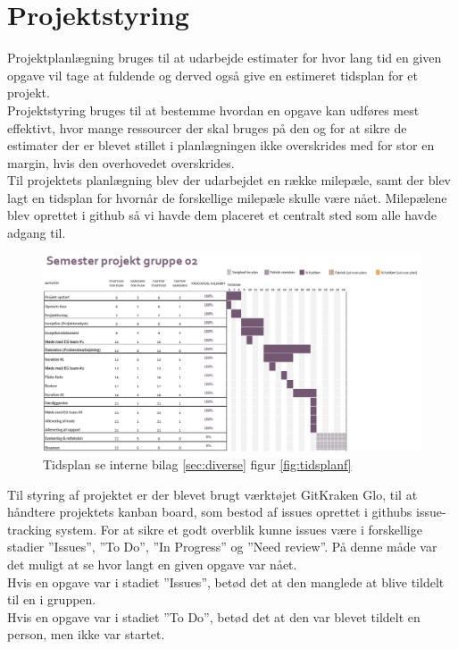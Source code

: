 \section{Projektstyring}
Projektplanlægning bruges til at udarbejde estimater for hvor lang tid en given opgave vil tage at fuldende og derved også give en estimeret tidsplan for et projekt.\\
Projektstyring bruges til at bestemme hvordan en opgave kan udføres mest effektivt, hvor mange ressourcer der skal bruges på den og for at sikre de estimater der er blevet stillet i planlægningen ikke overskrides med for stor en margin, hvis den overhovedet overskrides.\\
Til projektets planlægning blev der udarbejdet en række milepæle, samt der blev lagt en tidsplan for hvornår de forskellige milepæle skulle være nået. Milepælene blev oprettet i github så vi havde dem placeret et centralt sted som alle havde adgang til. 
\begin{figure}[h]
\includegraphics[width = \linewidth]{./PNG/proces/tidsplan.png}
\caption{Tidsplan se interne bilag \ref{sec:diverse} figur \ref{fig:tidsplanf}}
\label{fig:tidsplan}
\end{figure}
Til styring af projektet er der blevet brugt værktøjet GitKraken Glo, til at håndtere projektets kanban board, som bestod af issues oprettet i githubs issue-tracking system. For at sikre et godt overblik kunne issues være i forskellige stadier ”Issues”, ”To Do”, ”In Progress” og ”Need review”. På denne måde var det muligt at se hvor langt en given opgave var nået. \\
Hvis en opgave var i stadiet ”Issues”, betød det at den manglede at blive tildelt til en i gruppen. \\
Hvis en opgave var i stadiet ”To Do”, betød det at den var blevet tildelt en person, men ikke var startet.\\
